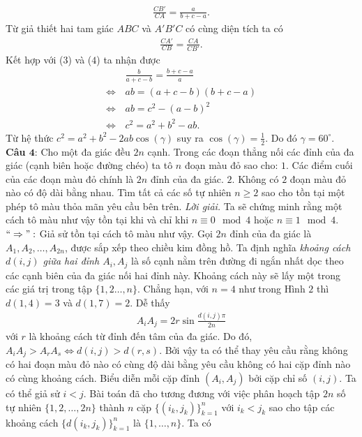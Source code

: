 \begin{multicols}{2}
		\begin{align*} 
			\frac{CB'}{CA} = \frac{a}{b+c-a}. \tag{$4$}
		\end{align*}
		Từ giả thiết hai tam giác $ABC$ và $A'B'C$ có cùng diện tích ta có
		\begin{align*}
			\frac{CA'}{CB} = \frac{CA}{CB'}.
		\end{align*}
		Kết hợp với ($3$) và ($4$) ta nhận được
		\begin{align*}
			&\frac{b}{a+c-b}  = \frac{b+c-a}{a} \\
			\Leftrightarrow \,&ab  = (a+c-b)(b+c-a) \\
			\Leftrightarrow \,&ab  = c^2 - (a-b)^2 \\
			\Leftrightarrow \,&c^2 = a^2 + b^2 - ab.
		\end{align*}
		Từ hệ thức $c^2 = a^2 + b^2 - 2 ab \cos(\gamma)$ suy ra $\cos(\gamma) = \frac{1}{2}$. Do đó $\gamma = 60^{\circ}$.
	\vskip 0.1cm
	\textbf{\color{cackithi}Câu $\pmb{4}$}: Cho một đa giác đều $2n$ cạnh. Trong các đoạn thẳng nối các đỉnh của đa giác (cạnh biên hoặc đường chéo) ta tô $n$ đoạn màu đỏ sao cho:
	\vskip 0.1cm
	$1.$ Các điểm cuối của các đoạn màu đỏ chính là $2n$ đỉnh của đa giác.
	\vskip 0.1cm
	$2.$ Không có $2$ đoạn màu đỏ nào có độ dài bằng nhau.
	\vskip 0.1cm
	Tìm tất cả các số tự nhiên $n \ge 2$ sao cho tồn tại một phép tô màu thỏa mãn yêu cầu bên trên.
	\vskip 0.1cm	
	\textit{Lời giải.}
	Ta sẽ chứng minh rằng một cách tô màu như vậy tồn tại khi và chỉ khi $n \equiv 0 \mod 4$ hoặc $n \equiv 1 \mod 4$.
	\vskip 0.1cm
	$``\Rightarrow":$ Giả sử tồn tại cách tô màu như vậy. Gọi $2n$ đỉnh của đa giác là $A_1, A_2, \ldots, A_{2n}$, được sắp xếp theo chiều kim đồng hồ. Ta định nghĩa \textit{khoảng cách $d(i,j)$ giữa hai đỉnh $A_i, A_j$} là số cạnh nằm trên đường đi ngắn nhất dọc theo các cạnh biên của đa giác nối hai đỉnh này. Khoảng cách này sẽ lấy một trong các giá trị trong tập $\{1,2\ldots,n\}$. Chẳng hạn, với $n=4$ như trong Hình $2$ thì $d(1,4) = 3$ và $d(1,7) = 2$. 
	\vskip 0.1cm
	Dễ thấy
	\begin{align*}
		A_iA_j = 2r \sin\frac{d(i,j)\pi}{2n}
	\end{align*}
	với $r$ là khoảng cách từ đỉnh đến tâm của đa giác. Do đó, $A_iA_j > A_rA_s \iff d(i,j) > d(r,s)$. Bởi vậy ta có thể thay yêu cầu rằng không có hai đoạn màu đỏ nào có cùng độ dài bằng yêu cầu không có hai cặp đỉnh nào có cùng khoảng cách.
	\vskip 0.1cm	
	Biểu diễn mỗi cặp đỉnh $(A_i, A_j)$ bởi cặp chỉ số $(i,j)$. Ta có thể giả sử $i <j$. Bài toán đã cho tương đương với việc phân hoạch tập $2n$ số tự nhiên $\{1,2,\ldots, 2n\}$ thành $n$ cặp $\{(i_k,j_k)\}_{k = 1}^n$ với $i_k<j_k$ sao cho tập các khoảng cách $\{d(i_k,j_k)\}_{k=1}^n$ là $\{1, \ldots, n\}$. Ta có

\end{multicols}
